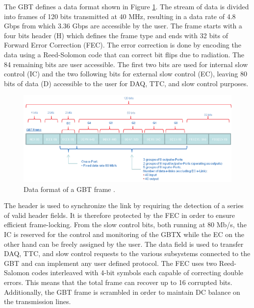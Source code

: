       The GBT defines a data format shown in Figure \ref{fig:II-2-gbt-frame}. The stream of data is divided into frames of 120 bits transmitted at 40 MHz, resulting in a data rate of 4.8 Gbps from which 3.36 Gbps are accessible by the user. The frame starts with a four bits header (H) which defines the frame type and ends with 32 bits of Forward Error Correction (FEC). The error correction is done by encoding the data using a Reed-Solomon code that can correct bit flips due to radiation. The 84 remaining bits are user accessible. The first two bits are used for internal slow control (IC) and the two following bits for external slow control (EC), leaving 80 bits of data (D) accessible to the user for DAQ, TTC, and slow control purposes. \\

      \begin{figure}[t!]
        \centering
        \includegraphics[width=\textwidth]{img/II-2-daq/gbt-frame.pdf}
        \caption{Data format of a GBT frame \cite{Moreira:1235836}.}
        \label{fig:II-2-gbt-frame}
      \end{figure}

      The header is used to synchronize the link by requiring the detection of a series of valid header fields. It is therefore protected by the FEC in order to ensure efficient frame-locking. From the slow control bits, both running at 80 Mb/s, the IC is reserved for the control and monitoring of the GBTX while the EC on the other hand can be freely assigned by the user. The data field is used to transfer DAQ, TTC, and slow control requests to the various subsystems connected to the GBT and can implement any user defined protocol. The FEC uses two Reed-Salomon codes interleaved with 4-bit symbols each capable of correcting double errors. This means that the total frame can recover up to 16 corrupted bits. Additionally, the GBT frame is scrambled in order to maintain DC balance on the transmission lines. \\

